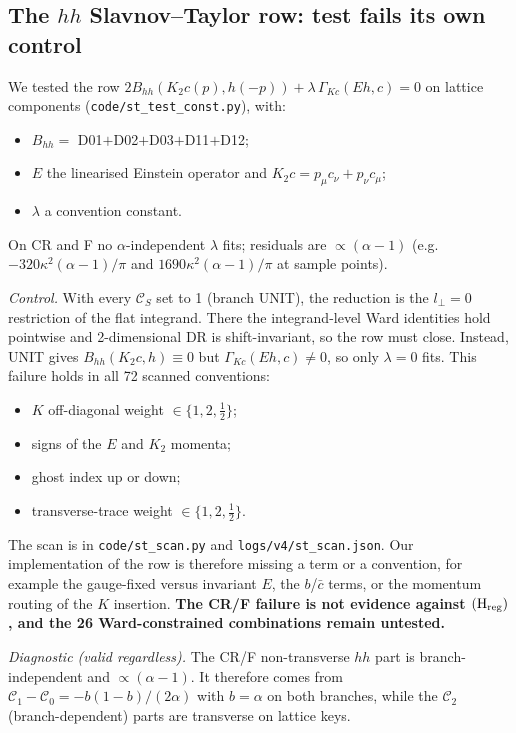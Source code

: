 \documentclass[11pt]{article}
\theoremstyle{definition}
\newcommand{\ka}{\kappa}
\newcommand{\Hreg}{(\mathrm H_{\rm reg})}
\newcommand{\Ccb}{\mathcal C}
\begin{document}
\subsection{The $hh$ Slavnov--Taylor row: test fails its own control}\label{sec:st}
We tested the row $2B_{hh}(K_2c(p),h(-p))+\lambda\,\Gamma_{Kc}(Eh,c)=0$ on lattice components (\texttt{code/st\_test\_const.py}), with:
\begin{itemize}
\item $B_{hh}=$ D01$+$D02$+$D03$+$D11$+$D12;
\item $E$ the linearised Einstein operator and $K_2c=p_\mu c_\nu+p_\nu c_\mu$;
\item $\lambda$ a convention constant.
\end{itemize}
On CR and F no $\alpha$-independent $\lambda$ fits; residuals are $\propto(\alpha-1)$ (e.g.\ $-320\ka^2(\alpha-1)/\pi$ and $1690\ka^2(\alpha-1)/\pi$ at sample points).

\emph{Control.} With every $\Ccb_S$ set to 1 (branch UNIT), the reduction is the $l_\perp=0$ restriction of the flat integrand. There the integrand-level Ward identities hold pointwise and 2-dimensional DR is shift-invariant, so the row must close. Instead, UNIT gives $B_{hh}(K_2c,h)\equiv0$ but $\Gamma_{Kc}(Eh,c)\neq0$, so only $\lambda=0$ fits. This failure holds in all 72 scanned conventions:
\begin{itemize}
\item $K$ off-diagonal weight $\in\{1,2,\frac12\}$;
\item signs of the $E$ and $K_2$ momenta;
\item ghost index up or down;
\item transverse-trace weight $\in\{1,2,\frac12\}$.
\end{itemize}
The scan is in \texttt{code/st\_scan.py} and \texttt{logs/v4/st\_scan.json}. Our implementation of the row is therefore missing a term or a convention, for example the gauge-fixed versus invariant $E$, the $b$/$\bar c$ terms, or the momentum routing of the $K$ insertion. \textbf{The CR/F failure is not evidence against $\Hreg$, and the 26 Ward-constrained combinations remain untested.}

\emph{Diagnostic (valid regardless).} The CR/F non-transverse $hh$ part is branch-independent and $\propto(\alpha-1)$. It therefore comes from $\Ccb_1-\Ccb_0=-b(1-b)/(2\alpha)$ with $b=\alpha$ on both branches, while the $\Ccb_2$ (branch-dependent) parts are transverse on lattice keys.
\end{document}
